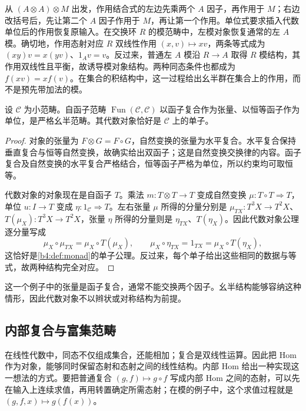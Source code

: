 从 \((A\otimes A)\otimes M\) 出发，作用结合式的左边先乘两个 \(A\) 因子，再作用于 \(M\)；右边改括号后，先让第二个 \(A\) 因子作用于 \(M\)，再让第一个作用。单位式要求插入代数单位后的作用恢复原输入。在交换环 \(R\) 的模范畴中，左模对象恢复通常的左 \(A\) 模。确切地，作用态射对应 \(R\) 双线性作用 \((x,v)\mapsto xv\)，两条等式成为 \((xy)v=x(yv)\)、\(1_Av=v\)。反过来，普通左 \(A\) 模沿 \(R\to A\) 取得 \(R\) 模结构，其作用双线性且平衡，故诱导模对象结构。两种同态条件也都成为 \(f(xv)=xf(v)\)。在集合的积结构中，这一过程给出幺半群在集合上的作用，而不是预先带加法的模。

\begin{proposition}\label{b4:prop:monads-as-monoidal-algebras}
	设 \(\mathcal C\) 为小范畴。自函子范畴 \(\operatorname{Fun}(\mathcal C,\mathcal C)\) 以函子复合作为张量、以恒等函子作为单位，是严格幺半范畴。其代数对象恰好是 \(\mathcal C\) 上的单子。
\end{proposition}
\begin{proof}
	对象的张量为 \(F\otimes G=F\circ G\)，自然变换的张量为水平复合。水平复合保持垂直复合与恒等自然变换，故确实给出双函子；这是自然变换交换律的内容。函子复合及自然变换的水平复合严格结合，恒等函子严格为单位，所以约束均可取恒等。

	代数对象的对象现在是自函子 \(T\)。乘法 \(m:T\otimes T\to T\) 变成自然变换 \(\mu:T\circ T\Rightarrow T\)，单位 \(u:I\to T\) 变成 \(\eta:1_{\mathcal C}\Rightarrow T\)。左右张量 \(\mu\) 所得的分量分别是 \(\mu_{TX}:T^3X\to T^2X\)、\(T(\mu_X):T^3X\to T^2X\)，张量 \(\eta\) 所得的分量则是 \(\eta_{TX}\)、\(T(\eta_X)\)。因此代数对象公理逐分量写成
	\[
		\mu_X\circ\mu_{TX}=\mu_X\circ T(\mu_X), \qquad \mu_X\circ\eta_{TX}=1_{TX}=\mu_X\circ T(\eta_X),
	\]
	这恰好是\cref{b4:def:monad}的单子公理。反过来，每个单子给出这些相同的数据与等式，故两种结构完全对应。
\end{proof}

这一个例子中的张量是函子复合，通常不能交换两个因子。幺半结构能够容纳这种情形，因此代数对象不以辫状或对称结构为前提。

\subsection{内部复合与富集范畴}
\label{b4:subsec:monoidal-enrichment}

在线性代数中，同态不仅组成集合，还能相加；复合是双线性运算。因此把 Hom 作为对象，能够同时保留态射和态射之间的线性结构。内部 Hom 给出一种实现这一想法的方式。要把普通复合 \((g,f)\mapsto g\circ f\) 写成内部 Hom 之间的态射，可以先在输入上连续求值，再用转置确定所需态射；在模的例子中，这个求值过程就是 \((g,f,x)\mapsto g(f(x))\)。

